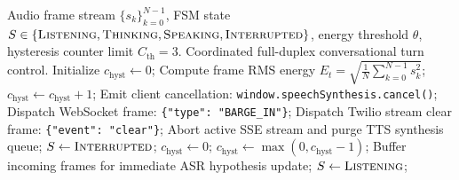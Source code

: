 \documentclass[review,12pt,times,authoryear]{elsarticle}
\theoremstyle{definition}
\begin{document}
\begin{algorithm}[t]
\caption{Full-Duplex Acoustic Barge-In Turn-Taking}
\label{alg:bargein_fsm}
\begin{algorithmic}[1]
\Require Audio frame stream $\{s_k\}_{k=0}^{N-1}$, FSM state $S \in \{\textsc{Listening}, \textsc{Thinking}, \textsc{Speaking}, \textsc{Interrupted}\}$, energy threshold $\theta$, hysteresis counter limit $C_{\mathrm{th}} = 3$.
\Ensure Coordinated full-duplex conversational turn control.
\State Initialize $c_{\mathrm{hyst}} \leftarrow 0$;
  \State Compute frame RMS energy $E_t = \sqrt{\frac{1}{N} \sum_{k=0}^{N-1} s_k^2}$;
      \State $c_{\mathrm{hyst}} \leftarrow c_{\mathrm{hyst}} + 1$;
        \State Emit client cancellation: \texttt{window.speechSynthesis.cancel()};
        \State Dispatch WebSocket frame: \texttt{\{"type": "BARGE\_IN"\}};
        \State Dispatch Twilio stream clear frame: \texttt{\{"event": "clear"\}};
        \State Abort active SSE stream and purge TTS synthesis queue;
        \State $S \leftarrow \textsc{Interrupted}$;
        \State $c_{\mathrm{hyst}} \leftarrow 0$;
      \EndIf
    \Else
      \State $c_{\mathrm{hyst}} \leftarrow \max(0, c_{\mathrm{hyst}} - 1)$;
    \EndIf
    \State Buffer incoming frames for immediate ASR hypothesis update;
    \State $S \leftarrow \textsc{Listening}$;
  \EndIf
\EndWhile
\end{algorithmic}
\end{algorithm}
\end{document}
